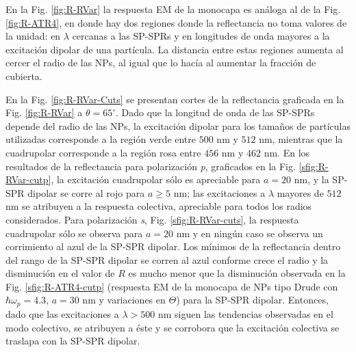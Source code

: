 En la Fig.   \ref{fig:R-RVar} la respuesta EM de la monocapa es análoga al de la Fig. \ref{fig:R-ATR4}, en donde hay dos regiones donde la reflectancia no toma valores de la unidad: en $\lambda$ cercanas a las SP-SPRs y en longitudes de onda mayores a la excitación dipolar de una partícula. La distancia entre estas regiones aumenta al cercer el radio de las NPs, al igual que lo hacía al aumentar la fracción de cubierta.

En la Fig. \ref{fig:R-RVar-Cuts} se presentan cortes de la reflectancia graficada en la Fig. \ref{fig:R-RVar} a $\theta = 65^\circ$. Dado que la longitud de onda de las SP-SPRs depende del radio de las NPs, la excitación dipolar para los tamaños de partículas utilizadas corresponde a la región verde entre $500$ nm y $512$ nm, mientras que la cuadrupolar corresponde a la región rosa entre $456$ nm y $462$ nm.
 En los resultados de la reflectancia para polarización \emph{p}, graficados en la Fig. \ref{sfig:R-RVar-cutp}, la excitación cuadrupolar sólo es apreciable para $a=20$ nm, y la SP-SPR dipolar se corre al rojo para $a\geq 5$ nm; las excitaciones a $\lambda$ mayores de $512$ nm se atribuyen a la respuesta colectiva, apreciable para todos los radios considerados. Para polarización \emph{s}, Fig. \ref{sfig:R-RVar-cuts}, la respuesta cuadrupolar sólo se observa para $a = 20$ nm y en ningún caso se observa un corrimiento al azul de la SP-SPR dipolar. Los mínimos de la reflectancia dentro del rango de la SP-SPR dipolar se corren al azul conforme crece el radio y la disminución en el valor de $R$ es mucho menor que la disminución  observada en la Fig. \ref{sfig:R-ATR4-cutp} (respuesta EM de la monocapa de NPs tipo Drude con $\hbar\omega_p = 4.3$, $a = 30$ nm y variaciones en $\Theta$) para la SP-SPR dipolar. Entonces, dado que las excitaciones a $\lambda>500$ nm siguen las tendencias observadas en el modo colectivo, se atribuyen a éste y se corrobora que la excitación colectiva se traslapa con la SP-SPR dipolar.

